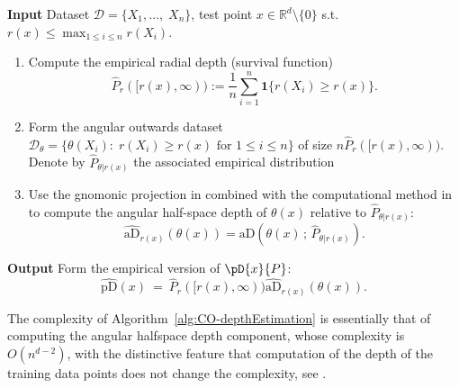 \documentclass{article}
\numberwithin{equation}{section}
\newcommand{\rset}{\mathbb{R}}
\newcommand{\ind}{\mathbf{1}}
\newcommand{\un}{\ind}
\newcommand{\pDsymbol}{\mathrm{pD}}  %
\newcommand{\coD}[2]{\pD{#1}{#2}}
\newcommand{\aD}[2]{{\mathrm{aD}}\left({#1}\,;\,{#2}\right)}
\newcommand{\hataD}[2]{\widehat{\mathrm{aD}}\left({#1}\,;\,{#2}\right)}
\begin{document}
\begin{algorithm}\caption{Computation of the Empirical Polar
    Depth}\label{alg:CO-depthEstimation}
    {\bf Input} Dataset $\mathcal{D}=\{X_1, \ldots,\; X_n\}$,
    test point $x\in\rset^d\setminus\{0\}$ s.t. $r(x)\leq \max_{1\leq i\leq
    n}r(X_i)$.  %
    \begin{enumerate}
        \item Compute the empirical radial depth (survival function)
            \begin{equation}\label{eq:alg_1:radial_part}
                \widehat P_r ([r(x),\infty)) := \frac{1}{n}\sum_{i=1}^n
                \un\{r(X_i)\ge r(x) \}.
            \end{equation}
        \item Form the angular outwards dataset $\mathcal{D}_\theta = \{
            \theta(X_i):\; r(X_i)\ge r(x) \text{ for } 1\le i\le n   \}$
            of size $n \widehat P_r ([r(x),\infty))$. Denote by
             $\widehat P_{\theta | r(x)}$ the associated empirical distribution 
        \item  Use the gnomonic projection in
            \cite{nagy2024theoretical} combined with the
            computational method in \cite{dyckerhoff2016exact} to
            compute the angular half-space
            depth of  $\theta(x)$ relative to $\widehat P_{\theta | r(x)}$:
            \begin{equation}\label{eq:alg_1:angular_part}
                \widehat{\mathrm{aD}}_{r(x)}(\theta(x)) =
                \aD{\theta(x)}{\widehat P_{\theta | r(x)}}.
            \end{equation}

    \end{enumerate}
    {\bf Output} Form the empirical version of $\coD{x}{P}$: 
    \begin{equation}\label{eq:algo_1:final_Form}
        \widehat{\pDsymbol}(x) ~=~ \widehat P_r([r(x),\infty))
         \widehat{\mathrm{aD}}_{r(x)}(\theta(x)).
    \end{equation}
\end{algorithm}

\medskip

The complexity of Algorithm~\ref{alg:CO-depthEstimation} is
essentially that of computing the angular halfspace depth component, whose
complexity is $O(n^{d-2})$,
with the distinctive feature that computation of the depth of the training
data points does not change the complexity, see \cite{NagyLD21}.
\end{document}
